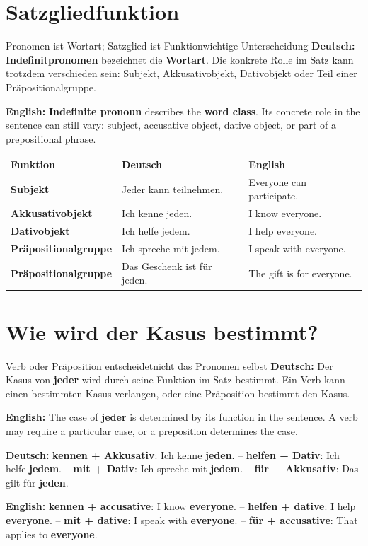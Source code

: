 \documentclass[a4paper,11pt]{article}
\newcommand{\GermanText}[1]{\textbf{Deutsch: }#1\par}
\newcommand{\EnglishText}[1]{{\small\color{SoftGray}\textbf{English: }#1\par}}
\begin{document}
\section{Satzgliedfunktion}
\begin{grammarentry}{Pronomen ist Wortart; Satzglied ist Funktion}{wichtige Unterscheidung}
\GermanText{\textbf{Indefinitpronomen} bezeichnet die \textbf{Wortart}. Die konkrete Rolle im Satz kann trotzdem verschieden sein: Subjekt, Akkusativobjekt, Dativobjekt oder Teil einer Präpositionalgruppe.}
\EnglishText{\textbf{Indefinite pronoun} describes the \textbf{word class}. Its concrete role in the sentence can still vary: subject, accusative object, dative object, or part of a prepositional phrase.}
\end{grammarentry}

\begin{longtable}{>{\bfseries}p{3.0cm}|p{5.4cm}|p{5.0cm}}
\rowcolor{HeaderBlueDark}
\color{white}\textbf{Funktion} & \color{white}\textbf{Deutsch} & \color{white}\textbf{English} \\
Subjekt & Jeder kann teilnehmen. & Everyone can participate. \\
Akkusativobjekt & Ich kenne jeden. & I know everyone. \\
Dativobjekt & Ich helfe jedem. & I help everyone. \\
Präpositionalgruppe & Ich spreche mit jedem. & I speak with everyone. \\
Präpositionalgruppe & Das Geschenk ist für jeden. & The gift is for everyone. \\
\end{longtable}

\section{Wie wird der Kasus bestimmt?}
\begin{grammarentry}{Verb oder Präposition entscheidet}{nicht das Pronomen selbst}
\GermanText{Der Kasus von \textbf{jeder} wird durch seine Funktion im Satz bestimmt. Ein Verb kann einen bestimmten Kasus verlangen, oder eine Präposition bestimmt den Kasus.}
\EnglishText{The case of \textbf{jeder} is determined by its function in the sentence. A verb may require a particular case, or a preposition determines the case.}
\GermanText{\textbf{kennen + Akkusativ}: Ich kenne \textbf{jeden}. -- \textbf{helfen + Dativ}: Ich helfe \textbf{jedem}. -- \textbf{mit + Dativ}: Ich spreche mit \textbf{jedem}. -- \textbf{für + Akkusativ}: Das gilt für \textbf{jeden}.}
\EnglishText{\textbf{kennen + accusative}: I know \textbf{everyone}. -- \textbf{helfen + dative}: I help \textbf{everyone}. -- \textbf{mit + dative}: I speak with \textbf{everyone}. -- \textbf{für + accusative}: That applies to \textbf{everyone}.}
\end{grammarentry}
\end{document}
